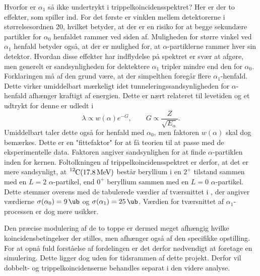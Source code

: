 Hvorfor er $\alpha_{1}$ så ikke undertrykt i trippelkoincidensspektret? Her er der to effekter, som
spiller ind. For det første er vinklen mellem detektorerne i størrelsesordnen 20\degree, hvilket
betyder, at der er en risiko for at begge sekundære partikler for $\alpha_{0}$ henfaldet rammer ved siden
af. Muligheden for større vinkel ved $\alpha_{1}$ henfald betyder også, at der er mulighed for, at
$\alpha$-partiklerne rammer hver sin detektor. Hvordan disse effekter har indflydelse på spektret er svær
at afgøre, men generelt er sandsynligheden for dektektere $\alpha_{1}$ tripler mindre end den for
$\alpha_{0}$. Forklaringen må af den grund være, at der simpelthen foregår flere
$\alpha_{1}$-henfald. Dette virker umiddelbart mærkeligt idet tunneleringssandsynligheden for
$\alpha$-henfald afhænger kraftigt af energien. Dette er nært relateret til levetiden og et udtrykt for
denne er udledt i \cite[s. 236]{Martin}
\begin{equation}
  \label{eq:SStunnel}
  \lambda \propto w(\alpha) e^{-G}, \qquad G \propto \frac{Z}{\sqrt{E_{\alpha}}}.
\end{equation}
Umiddelbart taler dette også for henfald med $\alpha_{0}$, men faktoren $w(\alpha)$ skal dog bemærkes. Dette
er en "fittefaktor" for at få teorien til at passe med de eksperimentelle data. Faktoren angiver
sandsynlighen for at finde $\alpha$-partiklen inden for kernen. Foltolkningen af
trippelkoincidensspektret er derfor, at det er mere sandsynligt, at $\Carb(\SI{17.8}{\MeV})$ består
beryllium i en $2^{+}$ tilstand sammen med en $L=2$ $\alpha$-partikel, end $0^{+}$ beryllium sammen med
en $L=0$ $\alpha$-partikel. Dette stemmer overens med de tabulerede værdier af tværsnittet i
\cite{States}, der angiver værdierne $\sigma(\alpha_{0}) = \SI{9}{\ub}$ og
$\sigma(\alpha_{1}) = \SI{25}{\ub}$. Værdien for tværsnittet af $\alpha_{1}$-processen er dog mere usikker.


Den præcise modulering af de to toppe er dermed meget afhængig hvilke koincidensbetingelser der
stilles, men afhænger også af den specifikke opstilling. For at opnå fuld forståelse af
fordelingen er det derfor nødvendigt at foretage en simulering. Dette ligger dog uden for tidsrammen
af dette projekt. Derfor vil dobbelt- og trippelkoincidenserne behandles separat i den videre
analyse. 